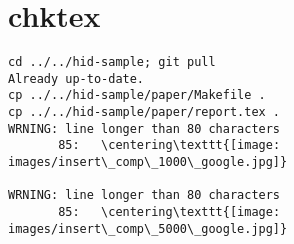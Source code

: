 \appendix
\section{chktex}
\begin{tiny}
\begin{verbatim}
cd ../../hid-sample; git pull
Already up-to-date.
cp ../../hid-sample/paper/Makefile .
cp ../../hid-sample/paper/report.tex .
WRNING: line longer than 80 characters
       85:   \centering\texttt{[image: images/insert\_comp\_1000\_google.jpg]}

WRNING: line longer than 80 characters
       85:   \centering\texttt{[image: images/insert\_comp\_5000\_google.jpg]}

\end{verbatim}
\end{tiny}
